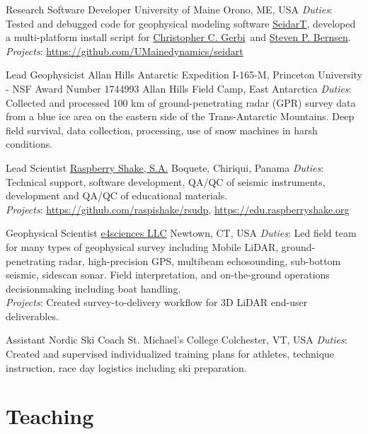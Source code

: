 \documentclass[a4paper,12pt,sans,colorlinks]{moderncv}
\newcommand{\stevebernsen}{\href{https://watc.alaska.edu/node/73}{Steven P. Bernsen}}
\newcommand{\chris}{\href{https://umaine.edu/earthclimate/people/christopher-gerbi/}{Christopher C. Gerbi}}
\newcommand{\seidart}{\href{https://github.com/UMainedynamics/SeidarT}{SeidarT}}
\newcommand{\raspishake}{\href{https://raspberryshake.org}{Raspberry Shake, S.A.}}
\newcommand{\efour}{\href{https://e4sciences.com}{e4sciences LLC}}
\begin{document}
{Research Software Developer}
{University of Maine}
{Orono, ME, USA}
{}
{
    \emph{Duties}: Tested and debugged code for geophysical modeling software
    \seidart, developed a multi-platform install script for \chris\ and
    \stevebernsen.
    \\
    \emph{Projects}: \url{https://github.com/UMainedynamics/seidart}
}

{Lead Geophysicist}
{Allan Hills Antarctic Expedition I-165-M,
Princeton University - NSF Award Number 1744993}
{Allan Hills Field Camp, East Antarctica}
{}
{
    \emph{Duties}: Collected and processed 100 km of ground-penetrating
    radar (GPR) survey data from a blue ice area on the eastern side of the
    Trans-Antarctic Mountains. Deep field survival, data collection,
    processing, use of snow machines in harsh conditions.
}

{Lead Scientist}
{\raspishake{}}
{Boquete, Chiriqui, Panama}
{}
{
    \emph{Duties}: Technical support, software development,
    QA/QC of seismic instruments, development and QA/QC of
    educational materials.
    \\
    \emph{Projects}: \url{https://github.com/raspishake/rsudp},
    \url{https://edu.raspberryshake.org}
}

{Geophysical Scientist}
{\efour{}}
{Newtown, CT, USA}
{}
{
    \emph{Duties}: Led field team for many types of geophysical survey
    including Mobile LiDAR, ground-penetrating radar, high-precision GPS,
    multibeam echosounding, sub-bottom seismic, sidescan sonar. Field
    interpretation, and on-the-ground operations decisionmaking including
    boat handling.
    \\
    \emph{Projects}: Created survey-to-delivery workflow for 3D LiDAR
    end-user deliverables.
}

{Assistant Nordic Ski Coach}
{St. Michael's College}
{Colchester, VT, USA}
{}
{
    \emph{Duties}: Created and supervised individualized training plans
    for athletes, technique instruction, race day logistics including
    ski preparation.
}


\section{Teaching}

\end{document}

